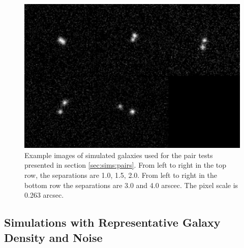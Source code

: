 \documentclass[fleqn,useAMS,usenatbib]{mnras}
\begin{document}
\begin{figure}
    \includegraphics[width=\textwidth]{figures/bdk-comb.png}
    \caption{Example images of simulated galaxies used for the pair tests
    presented in section \ref{sec:sims:pairs}.  From left to right in the top row,
    the separations are 1.0, 1.5, 2.0. From left to right in the bottom row the
    separations are 3.0 and 4.0 arscec. The pixel scale is 0.263 arcsec.
    \label{fig:pairs}}
\end{figure}

\subsection{Simulations with Representative Galaxy Density and Noise}
\label{sec:sims:realgals}
\end{document}
